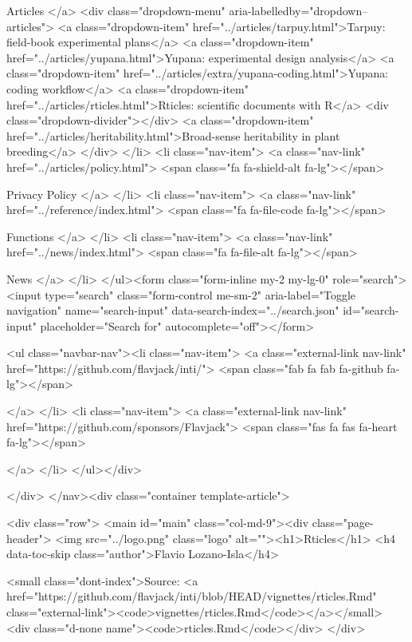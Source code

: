    Articles
  </a>
  <div class="dropdown-menu" aria-labelledby="dropdown--articles">
    <a class="dropdown-item" href="../articles/tarpuy.html">Tarpuy: field-book experimental plans</a>
    <a class="dropdown-item" href="../articles/yupana.html">Yupana: experimental design analysis</a>
    <a class="dropdown-item" href="../articles/extra/yupana-coding.html">Yupana: coding workflow</a>
    <a class="dropdown-item" href="../articles/rticles.html">Rticles: scientific documents with R</a>
    <div class="dropdown-divider"></div>
    <a class="dropdown-item" href="../articles/heritability.html">Broad-sense heritability in plant breeding</a>
  </div>
</li>
<li class="nav-item">
  <a class="nav-link" href="../articles/policy.html">
    <span class="fa fa-shield-alt fa-lg"></span>
     
    Privacy Policy
  </a>
</li>
<li class="nav-item">
  <a class="nav-link" href="../reference/index.html">
    <span class="fa fa-file-code fa-lg"></span>
     
    Functions
  </a>
</li>
<li class="nav-item">
  <a class="nav-link" href="../news/index.html">
    <span class="fa fa-file-alt fa-lg"></span>
     
    News
  </a>
</li>
      </ul><form class="form-inline my-2 my-lg-0" role="search">
        <input type="search" class="form-control me-sm-2" aria-label="Toggle navigation" name="search-input" data-search-index="../search.json" id="search-input" placeholder="Search for" autocomplete="off"></form>

      <ul class="navbar-nav"><li class="nav-item">
  <a class="external-link nav-link" href="https://github.com/flavjack/inti/">
    <span class="fab fa fab fa-github fa-lg"></span>
     
  </a>
</li>
<li class="nav-item">
  <a class="external-link nav-link" href="https://github.com/sponsors/Flavjack">
    <span class="fas fa fas fa-heart fa-lg"></span>
     
  </a>
</li>
      </ul></div>

    
  </div>
</nav><div class="container template-article">


<div class="row">
  <main id="main" class="col-md-9"><div class="page-header">
      <img src="../logo.png" class="logo" alt=""><h1>Rticles</h1>
                        <h4 data-toc-skip class="author">Flavio Lozano-Isla</h4>
            
      
      <small class="dont-index">Source: <a href="https://github.com/flavjack/inti/blob/HEAD/vignettes/rticles.Rmd" class="external-link"><code>vignettes/rticles.Rmd</code></a></small>
      <div class="d-none name"><code>rticles.Rmd</code></div>
    </div>

